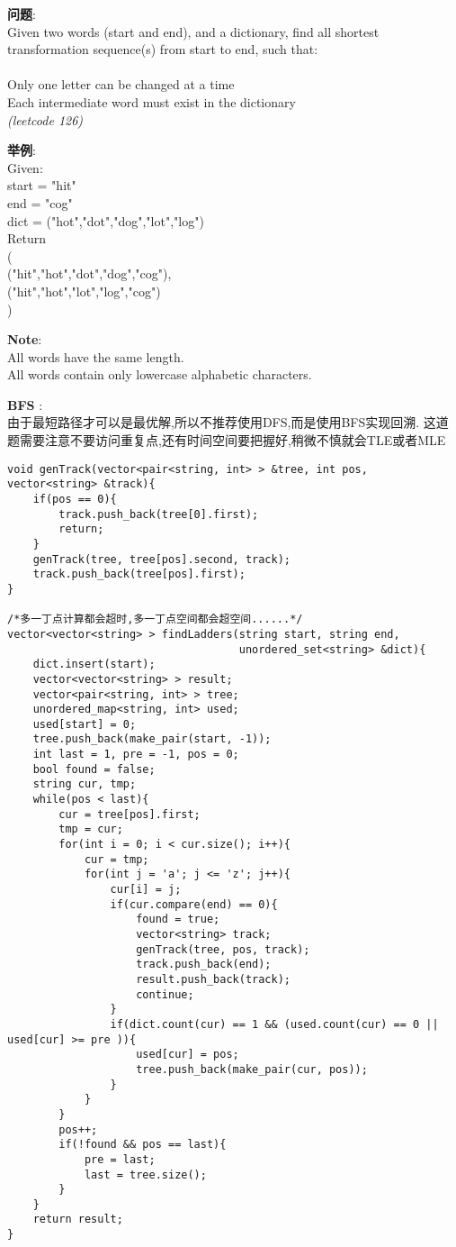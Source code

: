     
\begin{description}
    \item{\textbf{问题}}:\\
Given two words (start and end), and a dictionary, find all shortest transformation sequence(s) from start to end, such that:\\
\\
Only one letter can be changed at a time\\
Each intermediate word must exist in the dictionary\\
\textit{(leetcode 126)}
    \item{\textbf{举例}}:\\
Given:\\
start = "hit"\\
end = "cog"\\
dict = ("hot","dot","dog","lot","log")\\
Return\\
  (\\
    ("hit","hot","dot","dog","cog"),\\
    ("hit","hot","lot","log","cog")\\
  )\\
    \item{\textbf{Note}}:\\
All words have the same length.\\
All words contain only lowercase alphabetic characters.
    \item{\textbf{BFS}} : 
    \\由于最短路径才可以是最优解,所以不推荐使用DFS,而是使用BFS实现回溯. 这道题需要注意不要访问重复点,还有时间空间要把握好,稍微不慎就会TLE或者MLE
    \begin{lstlisting}
void genTrack(vector<pair<string, int> > &tree, int pos, vector<string> &track){
	if(pos == 0){
		track.push_back(tree[0].first);
		return;
	}
	genTrack(tree, tree[pos].second, track);
	track.push_back(tree[pos].first);
}

/*多一丁点计算都会超时,多一丁点空间都会超空间......*/
vector<vector<string> > findLadders(string start, string end,
									unordered_set<string> &dict){
	dict.insert(start);
	vector<vector<string> > result;
	vector<pair<string, int> > tree;
	unordered_map<string, int> used;
	used[start] = 0;
	tree.push_back(make_pair(start, -1));
	int last = 1, pre = -1, pos = 0;
	bool found = false;
	string cur, tmp;
	while(pos < last){
		cur = tree[pos].first;
		tmp = cur;
		for(int i = 0; i < cur.size(); i++){
			cur = tmp;
			for(int j = 'a'; j <= 'z'; j++){
				cur[i] = j;
				if(cur.compare(end) == 0){
					found = true;
					vector<string> track;
					genTrack(tree, pos, track);
					track.push_back(end);
					result.push_back(track);
					continue;
				}
				if(dict.count(cur) == 1 && (used.count(cur) == 0 || used[cur] >= pre )){
					used[cur] = pos;
					tree.push_back(make_pair(cur, pos));
				}
			}
		}
		pos++;
		if(!found && pos == last){
			pre = last;
			last = tree.size();
		}
	}
	return result;
}
    \end{lstlisting}
\end{description}
